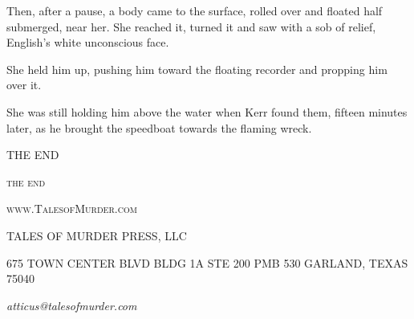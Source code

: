 \documentclass{novel}
\begin{document}
Then, after a pause, a body came to the surface, rolled over and floated half submerged, near her. She reached it, turned it and saw with a sob of relief, English's white unconscious face.

She held him up, pushing him toward the floating recorder and propping him over it.

She was still holding him above the water when Kerr found them, fifteen minutes later, as he brought the speedboat towards the flaming wreck.

THE END

\vspace{2\nbs}
\clearpage
\thispagestyle{empty}


\scenebreak
\scenebreak
{\centering\textsc{the end}\par}

\clearpage

\null

\centering\textsc{www.TalesofMurder.com}\par

\vspace*{10\nbs}


TALES OF MURDER PRESS, LLC

\null

\scshape{675 TOWN CENTER BLVD
BLDG 1A STE 200 PMB 530
GARLAND, TEXAS 75040}

\null

\textit{atticus@talesofmurder.com}
\vfill
\end{document}
